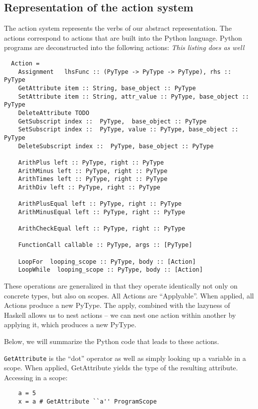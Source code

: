 \documentclass{article}[12pt]
\begin{document}
\subsection{Representation of the action system}
The action system represents the verbs of our abstract representation. The actions correspond to
actions that are built into the Python language. Python programs are
deconstructed into the following actions:
\emph{This listing does as well}
\begin{verbatim}
  Action =
    Assignment   lhsFunc :: (PyType -> PyType -> PyType), rhs :: PyType
    GetAttribute item :: String, base_object :: PyType 
    SetAttribute item :: String, attr_value :: PyType, base_object :: PyType 
    DeleteAttribute TODO
    GetSubscript index ::  PyType,  base_object :: PyType 
    SetSubscript index ::  PyType, value :: PyType, base_object :: PyType 
    DeleteSubscript index ::  PyType, base_object :: PyType 

    ArithPlus left :: PyType, right :: PyType 
    ArithMinus left :: PyType, right :: PyType 
    ArithTimes left :: PyType, right :: PyType
    ArithDiv left :: PyType, right :: PyType 

    ArithPlusEqual left :: PyType, right :: PyType
    ArithMinusEqual left :: PyType, right :: PyType

    ArithCheckEqual left :: PyType, right :: PyType

    FunctionCall callable :: PyType, args :: [PyType]

    LoopFor  looping_scope :: PyType, body :: [Action]
    LoopWhile  looping_scope :: PyType, body :: [Action]
\end{verbatim}

These operations are generalized in that they operate identically not only on concrete types, but
also on scopes. All Actions are ``Applyable''. When applied, all Actions produce a new PyType. The apply, combined with
the lazyness of Haskell allows us to nest actions -- we can nest one action within another by applying it, which
produces a new PyType.

Below, we will summarize the Python code that leads to these actions.

\verb=GetAttribute= is the ``dot'' operator as well as simply looking up a variable in a scope. When
applied, GetAttribute yields the type of the resulting attribute.
Accessing in a scope:
\begin{verbatim}
    a = 5
    x = a # GetAttribute ``a'' ProgramScope
\end{verbatim}
\end{document}

